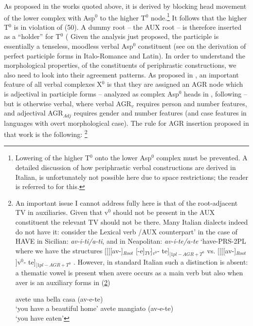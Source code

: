 \documentclass[output=paper]{langscibook}
\begin{document}
As proposed in the works quoted above, it is derived by blocking head movement of the lower complex with Asp$^0$ to the higher T$^0$ node.\footnote{Lowering of the higher T$^0$ onto the lower Asp$^0$ complex must be prevented. A detailed discussion of how periphrastic verbal constructions are derived in Italian, is unfortunately not possible here due to space restrictions; the reader is referred to \cite{calabrese2019a} for this.} It follows that the higher T$^0$ is in violation of (50).  A dummy root -- the AUX root -- is therefore inserted as a “holder” for T$^0$ (\cite{bjorkman2011a} Given the analysis just proposed, the participle is essentially a tenseless, moodless verbal Asp$^0$ constituent (see \cite{calabrese2020a} on the derivation of perfect participle forms in Italo-Romance and Latin).  
 In order to understand the morphological properties, of the constituents of periphrastic constructions, we also need to look into their agreement patterns.  As proposed in \cite{calabrese2019a}, an important feature of all verbal complexes X$^0$ is that they are assigned an AGR node which is adjectival in participle forms --  analyzed as complex Asp$^0$ heads in \cite{calabrese2019a}, following \cite{embick2000a, embick2004a} --  but is otherwise verbal, where verbal AGR$_v$ requires person and number features, and adjectival AGR$_{Adj}$ requires gender and number features (and case features in languages with overt morphological case). The rule for AGR insertion proposed in that work is the following: \footnote{An important issue I cannot address fully here is that of the root-adjacent TV in auxiliaries.  Given that v$^0$ should not be present in the AUX constituent the relevant TV should not be there.  Many Italian dialects indeed do not have it: consider the  Lexical verb /AUX counterpart’ in the case of HAVE in Sicilian: \textit{av-i-ti/a-ti}, and  in Neapolitan: \textit{av-i-te/a-te} ‘have-PRS-2PL where we have the structures [[[[av-]$_{Root}$ [-e]$_{TV}$]$_{v^0}$- te]$_{[1pl-AGR+T^0}$  vs. [[[[av-]$_{Root}$ ]v$^0$- te]$_{[1pl-AGR+T^0}$ . However, in standard Italian such a distinction is absent: a thematic vowel is present when avere occurs as a main verb but also when aver is an auxiliary forms in (\ref{fn38exb})
 
 \ea \label{fn38ex}
    \ea \label{fn38exa}avete una bella casa (av-e-te)\\
   ‘you have a beautiful home’
    \ex \label{fn38exb}avete mangiato (av-e-te)\\
   ‘you have eaten’
    \z
 \z
 
}
\end{document}
